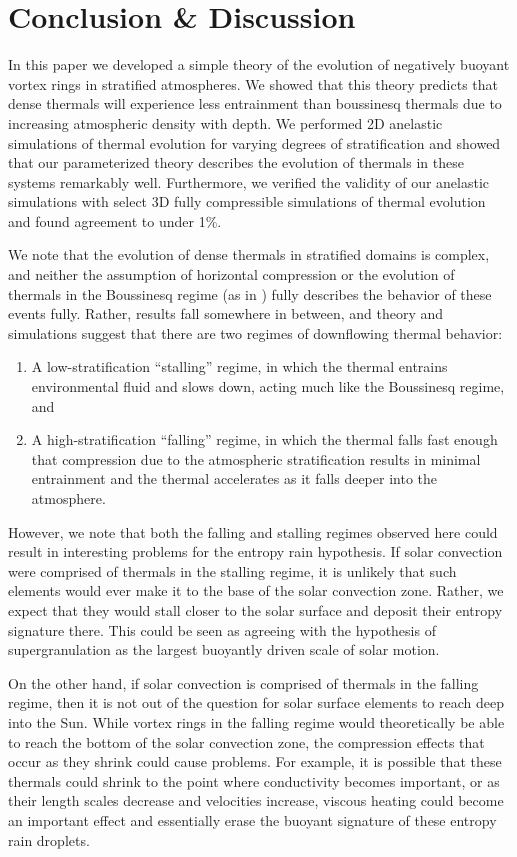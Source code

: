 \documentclass[twocolumn, amsmath, amsfonts, amssymb, trackchanges]{aastex62}
\newcommand{\LJ}{\citetalias{lecoanet&jeevanjee2018}}
\begin{document}
\section{Conclusion \& Discussion}
\label{sec:discussion}
In this paper we developed a simple theory of the evolution of negatively buoyant vortex rings in stratified atmospheres.
We showed that this theory predicts that dense thermals will experience less entrainment than boussinesq thermals due to increasing atmospheric density with depth.
We performed 2D anelastic simulations of thermal evolution for varying degrees of stratification and showed that our parameterized theory describes the evolution of thermals in these systems remarkably well.
Furthermore, we verified the validity of our anelastic simulations with select 3D fully compressible simulations of thermal evolution and found agreement to under 1\%.

We note that the evolution of dense thermals in stratified domains is complex, and neither the assumption of horizontal compression \citep[as in e.g.,][]{brandenburg2016} or the evolution of thermals in the Boussinesq regime (as in \LJ) fully describes the behavior of these events fully.
Rather, results fall somewhere in between, and theory and simulations suggest that there are two regimes of downflowing thermal behavior:
\begin{enumerate}
\item A low-stratification ``stalling'' regime, in which the thermal entrains environmental fluid and slows down, acting much like the Boussinesq regime, and
\item A high-stratification ``falling'' regime, in which the thermal falls fast enough that compression due to the atmospheric stratification results in minimal entrainment and the thermal accelerates as it falls deeper into the atmosphere.
\end{enumerate}

However, we note that both the falling and stalling regimes observed here could result in interesting problems for the entropy rain hypothesis. 
If solar convection were comprised of thermals in the stalling regime, it is unlikely that such elements would ever make it to the base of the solar convection zone.
Rather, we expect that they would stall closer to the solar surface and deposit their entropy signature there. 
This could be seen as agreeing with the hypothesis of supergranulation as the largest buoyantly driven scale of solar motion.

On the other hand, if solar convection is comprised of thermals in the falling regime, then it is not out of the question for solar surface elements to reach deep into the Sun.
While vortex rings in the falling regime would theoretically be able to reach the bottom of the solar convection zone, the compression effects that occur as they shrink could cause problems.
For example, it is possible that these thermals could shrink to the point where conductivity becomes important, or as their length scales decrease and velocities increase, viscous heating could become an important effect and essentially erase the buoyant signature of these entropy rain droplets.
\end{document}
